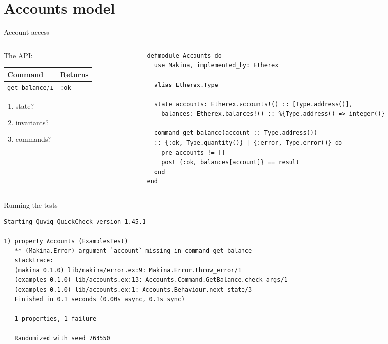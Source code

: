 \documentclass[aspectratio=169, 10pt]{beamer}
\begin{document}
\section{Accounts model}
\label{sec:org12103d1}
\begin{frame}[label={sec:org61813fc},fragile]{Account access}
 \begin{columns}
\begin{column}{0.28\columnwidth}
The API:

\begin{center}
\begin{tabular}{ll}
Command & Returns\\
\hline
\texttt{get\_balance/1} & \texttt{:ok}\\
\end{tabular}
\end{center}

\vspace{0.5cm}

\begin{enumerate}
\item state?
\item invariants?
\item commands?
\end{enumerate}
\end{column}

\begin{column}{0.68\columnwidth}
\lstset{language=elixir,label= ,caption= ,captionpos=b,numbers=none,style=display}
\begin{lstlisting}
defmodule Accounts do
  use Makina, implemented_by: Etherex

  alias Etherex.Type

  state accounts: Etherex.accounts!() :: [Type.address()],
    balances: Etherex.balances!() :: %{Type.address() => integer()}

  command get_balance(account :: Type.address())
  :: {:ok, Type.quantity()} | {:error, Type.error()} do
    pre accounts != []
    post {:ok, balances[account]} == result
  end
end
\end{lstlisting}
\end{column}
\end{columns}
\end{frame}

\begin{frame}[label={sec:org9e60420},fragile]{Running the tests}
 \lstset{language=bash,label= ,caption= ,captionpos=b,numbers=none,style=shell}
\begin{lstlisting}
Starting Quviq QuickCheck version 1.45.1

1) property Accounts (ExamplesTest)
   ** (Makina.Error) argument `account` missing in command get_balance
   stacktrace:
   (makina 0.1.0) lib/makina/error.ex:9: Makina.Error.throw_error/1
   (examples 0.1.0) lib/accounts.ex:13: Accounts.Command.GetBalance.check_args/1
   (examples 0.1.0) lib/accounts.ex:1: Accounts.Behaviour.next_state/3
   Finished in 0.1 seconds (0.00s async, 0.1s sync)

   1 properties, 1 failure

   Randomized with seed 763550
\end{lstlisting}
\end{frame}
\end{document}
